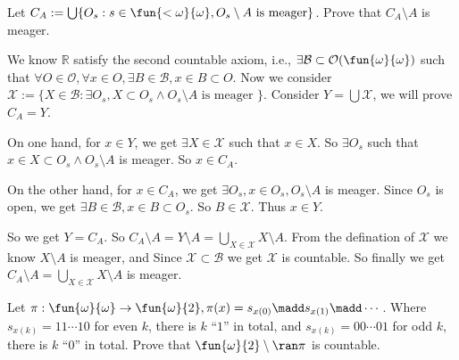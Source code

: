 \documentclass{ctexart}
\begin{document}
\begin{problem}
  Let \(C_A:= \bigcup \{O_s:s \in \fun{<\omega}{\omega},O_s\setminus A \text{ is meager}\} \). 
  Prove that \(C_A \setminus A \) is meager. 
\end{problem}

\begin{solution}
  We know \(\mathbb{R}\) satisfy the second countable axiom, i.e., \(\exists \mathcal{B} \subset \mathcal{O}(\fun{\omega}{\omega})\) such that \(\forall O \in \mathcal{O},\forall x \in O,\exists B \in \mathcal{B},x \in B \subset O\). 
  Now we consider \(\mathcal{X}:=\{X \in \mathcal{B}:\exists O_s,X \subset O_s \wedge O_s \setminus A \text{ is meager }\}\). 
  Consider \(Y= \bigcup \mathcal{X} \), we will prove \(C_A = Y\). 

  On one hand, for \(x \in Y\), we get \(\exists X \in \mathcal{X}\) such that \(x \in X\). 
  So \(\exists O_s\) such that \(x \in X \subset O_s \wedge O_s \setminus A\) is meager. So \(x \in C_A\). 

  On the other hand, for \(x \in C_A\), we get \(\exists O_s,x \in O_s,O_s \setminus A\) is meager.  
  Since \(O_s\) is open, we get \(\exists B \in \mathcal{B},x \in B \subset O_s\). 
  So \(B \in \mathcal{X}\). Thus \(x \in Y\). 

  So we get \(Y = C_A\). So \(C_A\setminus A=Y\setminus A = \bigcup_{X \in \mathcal{X}} X \setminus A \). 
  From the defination of \(\mathcal{X}\) we know \(X \setminus A\) is meager, and Since \(\mathcal{X} \subset \mathcal{B}\) we get \(\mathcal{X}\) is countable. 
  So finally we get \(C_A \setminus A = \bigcup_{X \in \mathcal{X}} X \setminus A\) is meager. 
\end{solution}

\begin{problem}
  Let \(\pi:\fun{\omega}{\omega} \to \fun{\omega}{2},\pi(x)=s_{x(0)}\madd s_{x(1)}\madd\cdots\). 
  Where \(s_{x(k)}=11\cdots10\) for even \(k\), there is \(k\) ``\(1\)'' in total, and \(s_{x(k)}=00\cdots0 1\) for odd \(k\), there is \(k\) ``\(0\)'' in total. 
  Prove that \(\fun{\omega}{2} \setminus \ran \pi\) is countable. 
\end{problem}
\end{document}
